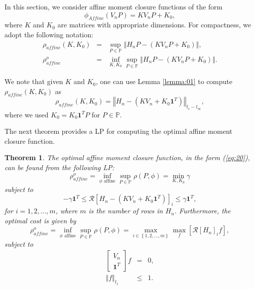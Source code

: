 \documentclass[letterpaper, 10 pt, conference]{ieeeconf}
\newtheorem{theorem}{Theorem}
\begin{document}
In this section, we consider affine moment closure functions of the form%
\begin{equation}
\phi _{Affine}\left( V_{n}P\right) =KV_{n}P+K_{0},  \label{eq:20}
\end{equation}%
where $K$ and $K_{0}$ are matrices with appropriate dimensions. For
compactness, we adopt the following notation:%
\begin{eqnarray*}
\rho _{affine}\left( K,K_{0}\right) &=&\sup_{P\in \mathbb{P}}\left\Vert
H_{n}P-\left( KV_{n}P+K_{0}\right) \right\Vert , \\
\rho _{affine}^{o} &=&\inf_{K,K_{0}}\sup_{P\in \mathbb{P}}\left\Vert
H_{n}P-\left( KV_{n}P+K_{0}\right) \right\Vert .
\end{eqnarray*}

We note that given $K$ and $K_{0}$, one can use Lemma \ref{lemma:01} to
compute $\rho _{affine}\left( K,K_{0}\right) $ as 
\begin{equation*}
\rho _{affine}\left( K,K_{0}\right) =\left\Vert H_{n}-\left( KV_{n}+K_{0}%
\mathbf{1}^{T}\right) \right\Vert _{l_{1}-l_{\infty }},
\end{equation*}%
where we used $K_{0}=K_{0}\mathbf{1}^{T}P$ for $P\in \mathbb{P}$.

The next theorem provides a LP for computing the optimal affine moment
closure function.

\bigskip

\begin{theorem}
\label{theorem:AffineMCF}The optimal affine moment closure function, in the
form (\ref{eq:20}), can be found from the following LP:%
\begin{equation*}
\rho _{affine}^{o}=\inf_{\phi \text{ affine}}\sup_{P\in \mathbb{P}}\rho
\left( P,\phi \right) =\min_{K,K_{0}}\gamma 
\end{equation*}%
subject to%
\begin{equation*}
-\gamma \mathbf{1}^{T}\leq \mathcal{R}\left[ H_{n}-\left( KV_{n}+K_{0}%
\mathbf{1}^{T}\right) \right] _{i}\leq \gamma \mathbf{1}^{T},
\end{equation*}%
for $i=1,2,...,m$, where $m$ is the number of rows in $H_{n}$. Furthermore,
the optimal cost is given by 
\begin{equation}
\rho _{affine}^{o}=\inf_{\phi \text{ affine}}\sup_{P\in \mathbb{P}}\rho
\left( P,\phi \right) =\max_{i\in \left\{ 1,2,...,m\right\} }\max_{f}\left[ 
\mathcal{R}\left[ H_{n}\right] _{i}f\right] ,  \label{eq:40}
\end{equation}%
subject to%
\begin{eqnarray}
\left[ 
\begin{array}{c}
V_{n} \\ 
\mathbf{1}^{T}%
\end{array}%
\right] f &=&0,  \label{eq:35} \\
\left\Vert f\right\Vert _{l_{1}} &\leq &1.  \label{eq:36}
\end{eqnarray}
\end{theorem}
\end{document}
